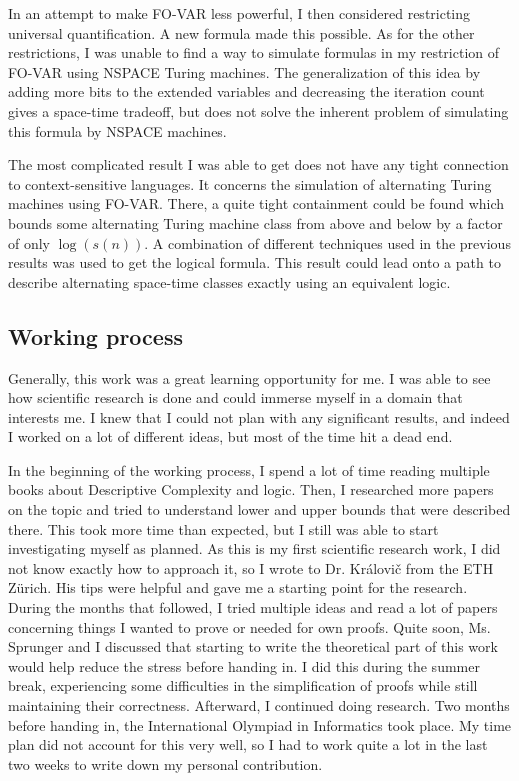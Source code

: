 In an attempt to make FO-VAR less powerful, I then considered restricting universal quantification.
A new formula made this possible.
As for the other restrictions, I was unable to find a way to simulate formulas in my restriction of FO-VAR using NSPACE Turing machines.
The generalization of this idea by adding more bits to the extended variables and decreasing the iteration count gives a space-time tradeoff, but does not solve the inherent problem of simulating this formula by NSPACE machines.

The most complicated result I was able to get does not have any tight connection to context-sensitive languages.
It concerns the simulation of alternating Turing machines using FO-VAR\@.
There, a quite tight containment could be found which bounds some alternating Turing machine class from above and below by a factor of only $\log(s(n))$.
A combination of different techniques used in the previous results was used to get the logical formula.
This result could lead onto a path to describe alternating space-time classes exactly using an equivalent logic.

\subsection{Working process}\label{subsec:working-process}
Generally, this work was a great learning opportunity for me.
I was able to see how scientific research is done and could immerse myself in a domain that interests me.
I knew that I could not plan with any significant results, and indeed I worked on a lot of different ideas, but most of the time hit a dead end.

In the beginning of the working process, I spend a lot of time reading multiple books about Descriptive Complexity and logic.
Then, I researched more papers on the topic and tried to understand lower and upper bounds that were described there.
This took more time than expected, but I still was able to start investigating myself as planned.
As this is my first scientific research work, I did not know exactly how to approach it, so I wrote to Dr. Královi\v{c} from the ETH Zürich.
His tips were helpful and gave me a starting point for the research.
During the months that followed, I tried multiple ideas and read a lot of papers concerning things I wanted to prove or needed for own proofs.
Quite soon, Ms. Sprunger and I discussed that starting to write the theoretical part of this work would help reduce the stress before handing in.
I did this during the summer break, experiencing some difficulties in the simplification of proofs while still maintaining their correctness.
Afterward, I continued doing research.
Two months before handing in, the International Olympiad in Informatics took place.
My time plan did not account for this very well, so I had to work quite a lot in the last two weeks to write down my personal contribution.

